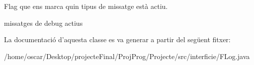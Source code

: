 Flag que ens marca quin tipus de missatge està actiu. 

missatges de debug actius 

La documentació d'aquesta classe es va generar a partir del següent fitxer\+:\begin{DoxyCompactItemize}
\item 
/home/oscar/\+Desktop/projecte\+Final/\+Proj\+Prog/\+Projecte/src/interficie/F\+Log.\+java\end{DoxyCompactItemize}
